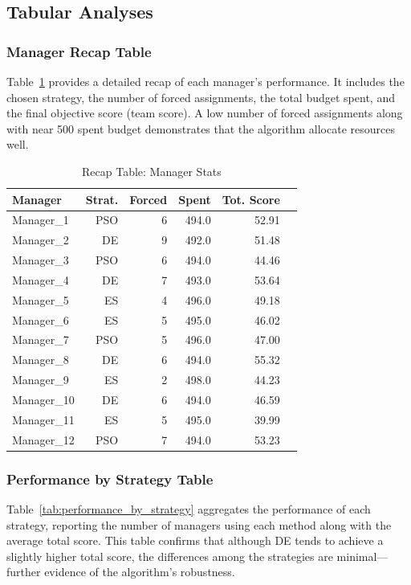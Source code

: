 \documentclass[sigconf]{acmart}
\begin{document}
	\subsection{Tabular Analyses}
	
	\subsubsection{Manager Recap Table}
	Table~\ref{tab:recap_manager} provides a detailed recap of each manager's performance. It includes the chosen strategy, the number of forced assignments, the total budget spent, and the final objective score (team score). A low number of forced assignments along with near 500 spent budget demonstrates that the algorithm allocate resources well.
	
	\begin{table}[H]
		\centering
		\caption{Recap Table: Manager Stats}
		\label{tab:recap_manager}
		\begin{tabular}{lrrrrr}
			\toprule
			\textbf{Manager} & \textbf{Strat.} & \textbf{Forced} & \textbf{Spent} & \textbf{Tot. Score} \\
			\midrule
			Manager\_1  & PSO & 6 & 494.0 & 52.91 \\
			Manager\_2  & DE  & 9 & 492.0 & 51.48 \\
			Manager\_3  & PSO & 6 & 494.0 & 44.46 \\
			Manager\_4  & DE  & 7 & 493.0 & 53.64 \\
			Manager\_5  & ES  & 4 & 496.0 & 49.18 \\
			Manager\_6  & ES  & 5 & 495.0 & 46.02 \\
			Manager\_7  & PSO & 5 & 496.0 & 47.00 \\
			Manager\_8  & DE  & 6 & 494.0 & 55.32 \\
			Manager\_9  & ES  & 2 & 498.0 & 44.23 \\
			Manager\_10 & DE  & 6 & 494.0 & 46.59 \\
			Manager\_11 & ES  & 5 & 495.0 & 39.99 \\
			Manager\_12 & PSO & 7 & 494.0 & 53.23 \\
			\bottomrule
		\end{tabular}
	\end{table}
	
	\subsubsection{Performance by Strategy Table}
	Table~\ref{tab:performance_by_strategy} aggregates the performance of each strategy, reporting the number of managers using each method along with the average total score. This table confirms that although DE tends to achieve a slightly higher total score, the differences among the strategies are minimal—further evidence of the algorithm's robustness.
	
\end{document}
